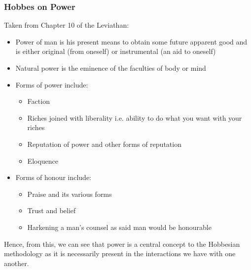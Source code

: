 \documentclass[12pt, letterpaper]{article}
\begin{document}
\subsubsection{Hobbes on Power}
Taken from Chapter 10 of the Leviathan:
\begin{itemize}
	\item Power of man is his present means to obtain some future apparent good and is either original (from oneself) or instrumental (an aid to oneself)
	\item Natural power is the eminence of the faculties of body or mind
	\item Forms of power include:
		\begin{itemize}
			\item Faction
			\item Riches joined with liberality i.e. ability to do what you want with your riches
			\item Reputation of power and other forms of reputation
			\item Eloquence
		\end{itemize}
	\item Forms of honour include:
		\begin{itemize}
			\item Praise and its various forms
			\item Trust and belief
			\item Harkening a man's counsel as said man would be honourable
		\end{itemize}
\end{itemize}
Hence, from this, we can see that power is a central concept to the Hobbesian methodology as it is necessarily present in the interactions we have with one another.
\end{document}
